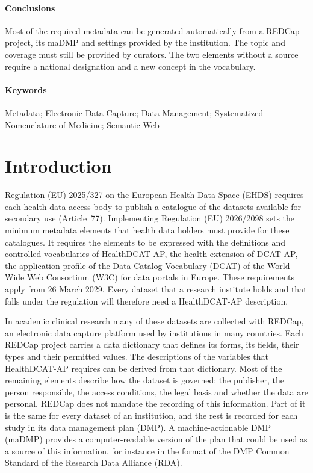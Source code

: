 \documentclass[12pt]{article}
\begin{document}
\paragraph{Conclusions} Most of the required metadata can be generated automatically
from a REDCap project, its maDMP and settings provided by the institution. The topic and
coverage must still be provided by curators. The two elements without a source require a
national designation and a new concept in the vocabulary.

\paragraph{Keywords} Metadata; Electronic Data Capture; Data Management; Systematized
Nomenclature of Medicine; Semantic Web

\newpage
\section{Introduction}

Regulation (EU) 2025/327 on the European Health Data Space (EHDS) requires each health
data access body to publish a catalogue of the datasets available for secondary use
(Article~77).\citep{ehds2025} Implementing Regulation (EU) 2026/2098 sets the minimum
metadata elements that health data holders must provide for these catalogues. It
requires the elements to be expressed with the definitions and controlled vocabularies of
HealthDCAT-AP, the health extension of DCAT-AP, the application profile of the Data Catalog Vocabulary (DCAT) of the World Wide Web
Consortium (W3C) for data portals in Europe.\citep{ir20262098,healthdcatap,dcatap}
These requirements apply from 26 March 2029. Every
dataset that a research institute holds and that falls under the regulation will
therefore need a HealthDCAT-AP description.

In academic clinical research many of these datasets are collected with REDCap,
an electronic data capture platform used by institutions in many countries.%
\citep{harris2009redcap,harris2019redcap} Each REDCap project carries a data dictionary
that defines its forms, its fields, their types and their permitted values. The
descriptions of the variables that HealthDCAT-AP requires can be derived from that
dictionary. Most of the
remaining elements describe how the dataset is governed: the publisher, the person
responsible, the access conditions, the legal basis and whether the data are personal.
REDCap does not mandate the recording of this information. Part of it is the same for every dataset of an
institution, and the rest is recorded for each study in its data management plan (DMP).
A machine-actionable DMP (maDMP) provides a computer-readable version of the plan that
could be used as a source of this information, for instance in the format of the DMP
Common Standard of the Research Data Alliance (RDA).\citep{rdadmp,miksa2019ten}
\end{document}
